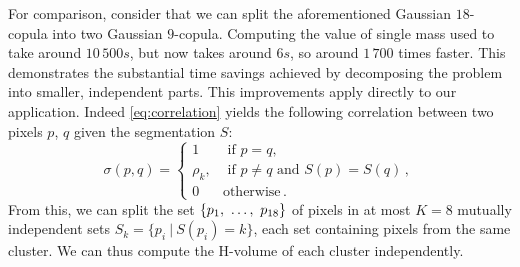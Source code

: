 For comparison, consider that we can split the aforementioned Gaussian $18$-copula into two Gaussian $9$-copula. Computing the value of single mass used to take around $10\,500s$, but now takes around $6s$, so around $1\,700$ times faster. This demonstrates the substantial time savings achieved by decomposing the problem into smaller, independent parts. This improvements apply directly to our application. Indeed \cref{eq:correlation} yields the following correlation between two pixels $p$, $q$ given the segmentation $S$:
\begin{equation*}
    \sigma(p, q) =
    \begin{cases}
        1 &\text{ if }p=q,\\
        \rho_k, &\text{ if } p\ne q\text{ and }S(p)=S(q)\,, \\
        0 & \text{otherwise}\,.
    \end{cases}
\end{equation*}
From this, we can split the set $\{p_1 , ~\dots, ~ p_{18}\}$ of pixels in at most $K=8$ mutually independent sets $S_k = \{p_i~|~S(p_i)=k\}$, each set containing pixels from the same cluster. We can thus compute the H-volume of each cluster independently.

